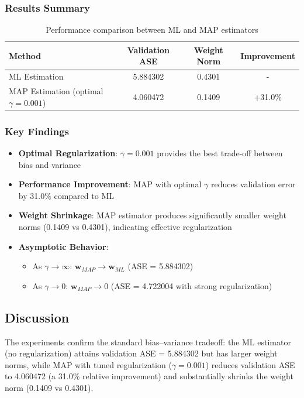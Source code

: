 \documentclass[12pt]{article}
\begin{document}
\subsubsection{Results Summary}
\begin{table}[H]
\centering
\begin{tabular}{lccc}
\toprule
Method & Validation ASE & Weight Norm & Improvement \\
\midrule
ML Estimation & 5.884302 & 0.4301 & - \\
MAP Estimation (optimal $\gamma=0.001$) & 4.060472 & 0.1409 & +31.0\% \\
\bottomrule
\end{tabular}
\caption{Performance comparison between ML and MAP estimators}
\label{tab:q2_results}
\end{table}

\subsubsection{Key Findings}
\begin{itemize}
    \item \textbf{Optimal Regularization}: $\gamma = 0.001$ provides the best trade-off between bias and variance
    \item \textbf{Performance Improvement}: MAP with optimal $\gamma$ reduces validation error by 31.0\% compared to ML
    \item \textbf{Weight Shrinkage}: MAP estimator produces significantly smaller weight norms (0.1409 vs 0.4301), indicating effective regularization
    \item \textbf{Asymptotic Behavior}: 
    \begin{itemize}
        \item As $\gamma \to \infty$: $\mathbf{w}_{MAP} \to \mathbf{w}_{ML}$ (ASE = 5.884302)
        \item As $\gamma \to 0$: $\mathbf{w}_{MAP} \to 0$ (ASE = 4.722004 with strong regularization)
    \end{itemize}
\end{itemize}

\subsection{Discussion}

The experiments confirm the standard bias–variance tradeoff: the ML estimator (no regularization) attains validation ASE = 5.884302 but has larger weight norms, while MAP with tuned regularization ($\gamma=0.001$) reduces validation ASE to 4.060472 (a 31.0\% relative improvement) and substantially shrinks the weight norm (0.1409 vs 0.4301). \\
\end{document}
